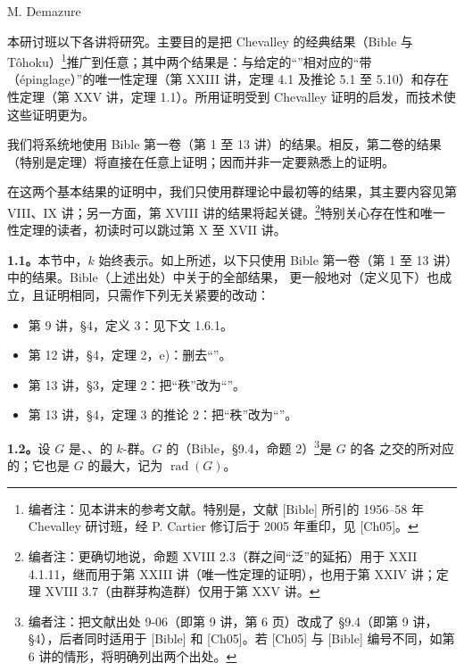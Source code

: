 \begin{center}M. Demazure\end{center}
本研讨班以下各讲将研究。主要目的是把 Chevalley 的经典结果（Bible 与 Tôhoku）\footnote[1]{编者注：见本讲末的参考文献。特别是，文献 [Bible] 所引的 1956--58 年 Chevalley 研讨班，经 P. Cartier 修订后于 2005 年重印，见 [Ch05]。}推广到任意；其中两个结果是：与给定的“”相对应的“带（épinglage）”的唯一性定理（第 XXIII 讲，定理 4.1 及推论 5.1 至 5.10）和存在性定理（第 XXV 讲，定理 1.1）。所用证明受到 Chevalley 证明的启发，而技术使这些证明更为。

我们将系统地使用 Bible 第一卷（第 1 至 13 讲）的结果。相反，第二卷的结果（特别是定理）将直接在任意上证明；因而并非一定要熟悉上的证明。

在这两个基本结果的证明中，我们只使用群理论中最初等的结果，其主要内容见第 VIII、IX 讲；另一方面，第 XVIII 讲的结果将起关键。\footnote[2]{编者注：更确切地说，命题 XVIII 2.3（群之间“泛”的延拓）用于 XXII 4.1.11，继而用于第 XXIII 讲（唯一性定理的证明），也用于第 XXIV 讲；定理 XVIII 3.7（由群芽构造群）仅用于第 XXV 讲。}特别关心存在性和唯一性定理的读者，初读时可以跳过第 X 至 XVII 讲。

\textbf{1.1。}本节中，$k$ 始终表示。如上所述，以下只使用 Bible 第一卷（第 1 至 13 讲）中的结果。Bible（上述出处）中关于的全部结果，
更一般地对（定义见下）也成立，且证明相同，只需作下列无关紧要的改动：
\begin{itemize}
\item 第 9 讲，\S 4，定义 3：见下文 1.6.1。
\item 第 12 讲，\S 4，定理 2，e)：删去“”。
\item 第 13 讲，\S 3，定理 2：把“秩”改为“”。
\item 第 13 讲，\S 4，定理 3 的推论 2：把“秩”改为“”。
\end{itemize}
\textbf{1.2。}设 $G$ 是、、的 $k$-群。$G$ 的（Bible，\S 9.4，命题 2）\footnote[3]{编者注：把文献出处 9-06（即第 9 讲，第 6 页）改成了 \S 9.4（即第 9 讲，\S 4），后者同时适用于 [Bible] 和 [Ch05]。若 [Ch05] 与 [Bible] 编号不同，如第 6 讲的情形，将明确列出两个出处。}是 $G$ 的各 之交的所对应的；它也是 $G$ 的最大，记为 $\operatorname{rad}(G)$。

